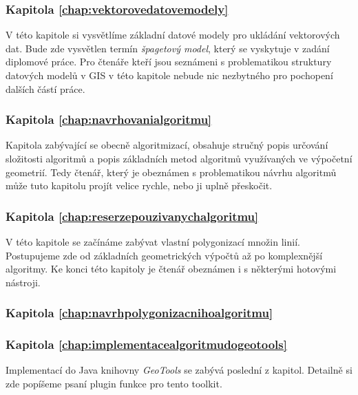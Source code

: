 \subsubsection{Kapitola \ref{chap:vektorovedatovemodely}}
	V této kapitole si vysvětlíme základní datové modely pro ukládání vektorových dat. Bude zde vysvětlen termín \textit{špagetový model}, který se vyskytuje v zadání diplomové práce. Pro čtenáře kteří jsou seznámeni s problematikou struktury datových modelů v GIS v této kapitole nebude nic nezbytného pro pochopení dalších částí práce.




\subsubsection{Kapitola \ref{chap:navrhovanialgoritmu}}
	Kapitola zabývající se obecně algoritmizací, obsahuje stručný popis určování složitosti algoritmů a popis základních metod algoritmů využívaných ve výpočetní geometrií. Tedy čtenář, který je obeznámen s problematikou návrhu algoritmů může tuto kapitolu projít velice rychle, nebo ji uplně přeskočit.

\subsubsection{Kapitola \ref{chap:reserzepouzivanychalgoritmu}}
 	V této kapitole se začínáme zabývat vlastní polygonizací množin linií. Postupujeme zde od základních geometrických výpočtů až po komplexnější algoritmy. Ke konci této kapitoly je čtenář obeznámen i s některými hotovými nástroji.

\subsubsection{Kapitola \ref{chap:navrhpolygonizacnihoalgoritmu}}
	
	

\subsubsection{Kapitola \ref{chap:implementacealgoritmudogeotools}}
	Implementací do Java knihovny \textit{GeoTools} se zabývá poslední z kapitol. Detailně si zde popíšeme psaní plugin funkce pro tento toolkit.


